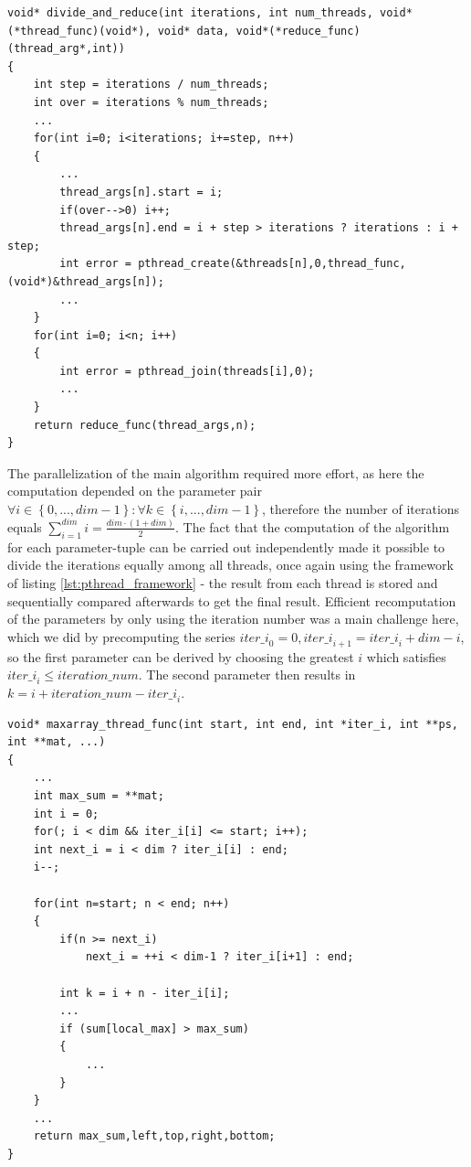 \documentclass[conference]{IEEEtran}
\begin{document}
\begin{center}
   \begin{lstlisting}[captionpos=b, caption=pthread: Framework used for dividing iterations among a fixed number of threads and reducing the results afterwards, label=lst:pthread_framework]
void* divide_and_reduce(int iterations, int num_threads, void*(*thread_func)(void*), void* data, void*(*reduce_func)(thread_arg*,int))
{
	int step = iterations / num_threads;
	int over = iterations % num_threads;
	...
	for(int i=0; i<iterations; i+=step, n++)
	{
		...
		thread_args[n].start = i;
		if(over-->0) i++;
		thread_args[n].end = i + step > iterations ? iterations : i + step;
		int error = pthread_create(&threads[n],0,thread_func,(void*)&thread_args[n]);
		...
	}
	for(int i=0; i<n; i++)
	{
		int error = pthread_join(threads[i],0);
		...
	}
	return reduce_func(thread_args,n);
}
   \end{lstlisting}
\end{center}

The parallelization of the main algorithm required more effort, as here the computation depended on the parameter pair $\forall i\in \left\lbrace 0,...,\mathit{dim}-1 \right\rbrace :\forall k\in \left\lbrace i,...,\mathit{dim}-1 \right\rbrace$, therefore the number of iterations equals $\sum^{\mathit{dim}}_{i=1}i=\frac{\mathit{dim}\cdot (1+\mathit{dim})}{2}$. The fact that the computation of the algorithm for each parameter-tuple can be carried out independently made it possible to divide the iterations equally among all threads, once again using the framework of listing \ref{lst:pthread_framework} - the result from each thread is stored and sequentially compared afterwards to get the final result. Efficient recomputation of the parameters by only using the iteration number was a main challenge here, which we did by precomputing the series $\mathit{iter\_i}_0=0, \mathit{iter\_i}_{i+1}=\mathit{iter\_i}_{i}+\mathit{dim}-i$, so the first parameter can be derived by choosing the greatest $i$ which satisfies $\mathit{iter\_i}_i\leq \mathit{iteration\_num}$. The second parameter then results in $k=i+\mathit{iteration\_num}-\mathit{iter\_i}_{i}$.

\begin{center}
   \begin{lstlisting}[captionpos=b, caption=pthread: Parallel Main Algorithm (simplified), label=lst:pthread_maincomp]
void* maxarray_thread_func(int start, int end, int *iter_i, int **ps, int **mat, ...)
{
	...
	int max_sum = **mat;
	int i = 0;
	for(; i < dim && iter_i[i] <= start; i++);
	int next_i = i < dim ? iter_i[i] : end;
	i--;

	for(int n=start; n < end; n++)
	{
		if(n >= next_i) 
			next_i = ++i < dim-1 ? iter_i[i+1] : end;
		
		int k = i + n - iter_i[i];
		...
		if (sum[local_max] > max_sum)
		{
			...
		}
	}
	...
	return max_sum,left,top,right,bottom;
}
        
   \end{lstlisting}
\end{center}
\end{document}
